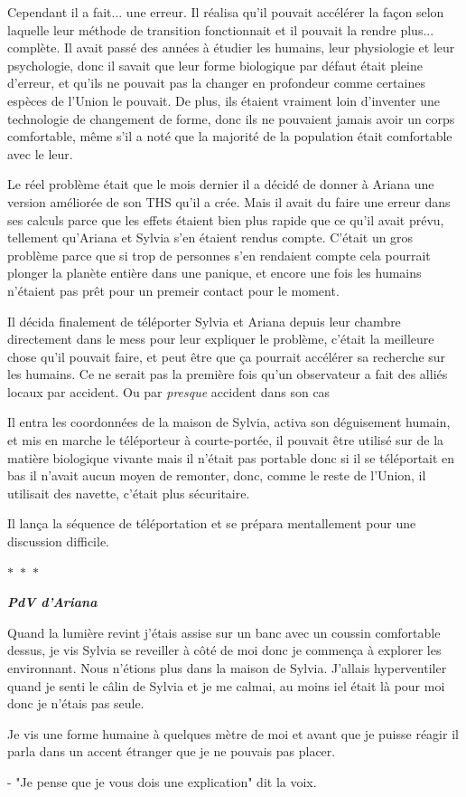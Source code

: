 \documentclass[12pt,colorlinks,a4paper]{book}
\newcommand{\sep}{\begin{center}
    $\ast$~$\ast$~$\ast$
  \end{center}}
\begin{document}
Cependant il a fait... une erreur. Il réalisa qu'il pouvait accélérer la façon selon laquelle leur méthode de transition 
fonctionnait et il pouvait la rendre plus... complète. Il avait passé des années à étudier les humains, leur physiologie 
et leur psychologie, donc il savait que leur forme biologique par défaut était pleine d'erreur, et qu'ils ne pouvait pas 
la changer en profondeur comme certaines espèces de l'Union le pouvait. De plus, ils étaient vraiment loin d'inventer 
une technologie de changement de forme, donc ils ne pouvaient jamais avoir un corps comfortable, même s'il a noté 
que la majorité de la population était comfortable avec le leur.\par 
\bigskip

Le réel problème était que le mois dernier il a décidé de donner à Ariana une version améliorée de son THS qu'il a crée.
Mais il avait du faire une erreur dans ses calculs parce que les effets étaient bien plus rapide que ce qu'il avait prévu,
tellement qu'Ariana et Sylvia s'en étaient rendus compte. C'était un gros problème parce que si trop de personnes s'en rendaient 
compte cela pourrait plonger la planète entière dans une panique, et encore une fois les humains n'étaient pas prêt pour 
un premeir contact pour le moment. \par 
\bigskip

Il décida finalement de téléporter Sylvia et Ariana depuis leur chambre directement dans le mess pour leur expliquer 
le problème, c'était la meilleure chose qu'il pouvait faire, et peut être que ça pourrait accélérer sa recherche 
sur les humains. Ce ne serait pas la première fois qu'un observateur a fait des alliés locaux par accident. Ou 
par \textit{presque} accident dans son cas\par 
\bigskip

Il entra les coordonnées de la maison de Sylvia, activa son déguisement humain, et mis en marche le téléporteur à courte-portée,
il pouvait être utilisé sur de la matière biologique vivante mais il n'était pas portable donc si il se téléportait en bas il 
n'avait aucun moyen de remonter, donc, comme le reste de l'Union, il utilisait des navette, c'était plus sécuritaire.\par 
\bigskip

Il lança la séquence de téléportation et se prépara mentallement pour une discussion difficile.

\sep

\textit{\textbf{PdV d'Ariana}}

Quand la lumière revint j'étais assise sur un banc avec un coussin comfortable dessus, je vis Sylvia se reveiller 
à côté de moi donc je commença à explorer les environnant. Nous n'étions plus dans la maison de Sylvia.
J'allais hyperventiler quand je senti le câlin de Sylvia et je me calmai, au moins iel était là pour moi donc je n'étais 
pas seule.\par 
\bigskip

Je vis une forme humaine à quelques mètre de moi et avant que je puisse réagir il parla dans un accent étranger que je ne pouvais
pas placer.\par 
\bigskip

- "Je pense que je vous dois une explication" dit la voix.


\printglossaries 
\end{document}

